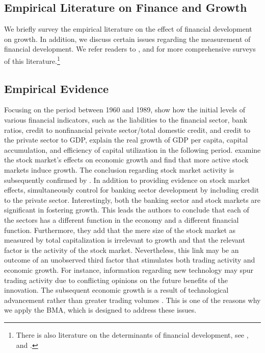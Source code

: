 \begin{refsection}
\section{Empirical Literature on Finance and Growth}
\label{ch2sec:litsurvey}

We briefly survey the empirical literature on the effect of financial development on growth. In addition, we discuss certain issues regarding the measurement of financial development. We refer readers to \textcite{Levine2005}, \textcite{Ang2008} and \textcite{Valickovaetal2014} for more comprehensive surveys of this literature.\footnote{There is also literature on the determinants of financial development, see \textcite{Ang2013}, and \textcite{angkumar}.}

\subsection{Empirical Evidence}

Focusing on the period between 1960 and 1989, \textcite{KingLevine1993a} show how the initial levels of various financial indicators, such as the liabilities to the financial sector, bank ratios, credit to nonfinancial private sector/total domestic credit, and credit to the private sector to GDP, explain the real growth of GDP per capita, capital accumulation, and efficiency of capital utilization in the following period. \textcite{AtjeJovanovich1993} examine the stock market's effects on economic growth and find that more active stock markets induce growth. The conclusion regarding stock market activity is subsequently confirmed by \textcite{LevineZervos1998}. In addition to providing evidence on stock market effects, \textcite{LevineZervos1998} simultaneously control for banking sector development by including credit to the private sector. Interestingly, both the banking sector and stock markets are significant in fostering growth. This leads the authors to conclude that each of the sectors has a different function in the economy and a different financial function. Furthermore, they add that the mere size of the stock market as measured by total capitalization is irrelevant to growth and that the relevant factor is the activity of the stock market. Nevertheless, this link may be an outcome of an unobserved third factor that stimulates both trading activity and economic growth. For instance, information regarding new technology may spur trading activity due to conflicting opinions on the future benefits of the innovation. The subsequent economic growth is a result of technological advancement rather than greater trading volumes \parencite{Levine2005}. This is one of the reasons why we apply the \ac{BMA}, which is designed to address these issues.


\end{refsection}

